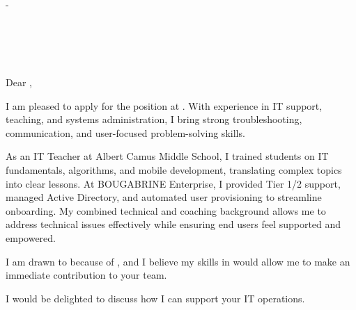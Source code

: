 \documentclass[11pt,a4paper]{article}
\begin{document}
\begin{flushright}
    {\textbf{\FullName}} - \JobTitle \\
    \Phone \\
    \href{mailto:\Email}{\Email} \\
    \Location \\
    \LinkedIn \\
    \GitHub
\end{flushright}


Dear \HiringManager,

I am pleased to apply for the \JobTitle position at \CompanyName. With experience in IT support, teaching, and systems administration, I bring strong troubleshooting, communication, and user-focused problem-solving skills.

As an IT Teacher at Albert Camus Middle School, I trained students on IT fundamentals, algorithms, and mobile development, translating complex topics into clear lessons. At BOUGABRINE Enterprise, I provided Tier 1/2 support, managed Active Directory, and automated user provisioning to streamline onboarding. My combined technical and coaching background allows me to address technical issues effectively while ensuring end users feel supported and empowered.

I am drawn to \CompanyName because of \YourMotivation, and I believe my skills in \JobKeywords would allow me to make an immediate contribution to your team.

I would be delighted to discuss how I can support your IT operations.

\Signature
\end{document}
